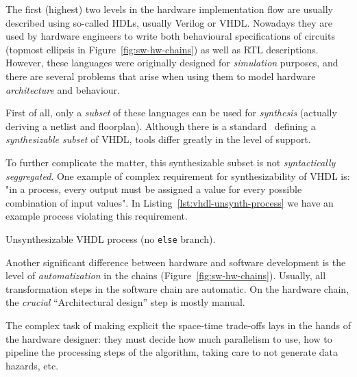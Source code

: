         The first (highest) two levels in the hardware implementation flow are usually described using
        so-called \acp{HDL}, usually Verilog or \acs{VHDL}.
        Nowadays they are used by hardware engineers to write both behavioural specifications of circuits
        (topmost ellipsis in Figure~\ref{fig:sw-hw-chains}) as well as \ac{RTL} descriptions.
        However, these languages were originally designed for \emph{simulation} purposes,
        and there are several problems that arise when using them to
        model hardware \emph{architecture} and behaviour.

        First of all, only a \emph{subset} of these languages can be used for \emph{synthesis}
        (actually deriving a netlist and floorplan).
        Although there is a standard~\cite{ieee1076-3-synth-vhdl} defining a \emph{synthesizable subset} of \acs{VHDL},
        tools differ greatly in the level of support.

        To further complicate the matter, this synthesizable subset is not \emph{syntactically seggregated}.
        One example of complex requirement for synthesizability of \acs{VHDL} is:
        "in a process, every output must be assigned a value for every possible combination of input values".
        In Listing~\ref{lst:vhdl-unsynth-process} we have an example process violating this requirement.

        \begin{listing}[h]
            \begin{center}
            \end{center}
            \caption{Unsynthesizable \acs{VHDL} process (no \texttt{else} branch).
                \label{lst:vhdl-unsynth-process}}
        \end{listing}

        Another significant difference between hardware and software development
        is the level of \emph{automatization} in the chains (Figure~\ref{fig:sw-hw-chains}).
        Usually, all transformation steps in the software chain are automatic.
        On the hardware chain, the \emph{crucial} ``Architectural design'' step is mostly manual.

        The complex task of making explicit the space-time trade-offs lays in the hands of the hardware designer:
        they must decide how much parallelism to use, how to pipeline the processing steps of the algorithm,
        taking care to not generate data hazards, etc.

